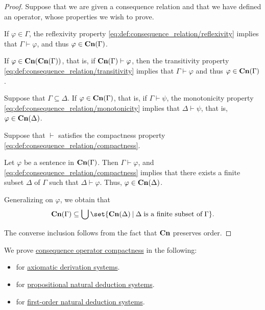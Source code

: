 \begin{proof}
   Suppose that we are given a consequence relation and that we have defined an operator, whose properties we wish to prove.

   If \( \varphi \in \Gamma \), the reflexivity property \eqref{eq:def:consequence_relation/reflexivity} implies that \( \Gamma \vdash \varphi \), and thus \( \varphi \in \op*{Cn}(\Gamma) \).

   If \( \varphi \in \op*{Cn}(\op*{Cn}(\Gamma)) \), that is, if \( \op*{Cn}(\Gamma) \vdash \varphi \), then the transitivity property \eqref{eq:def:consequence_relation/transitivity} implies that \( \Gamma \vdash \varphi \) and thus \( \varphi \in \op*{Cn}(\Gamma) \).

   Suppose that \( \Gamma \subseteq \Delta \). If \( \varphi \in \op*{Cn}(\Gamma) \), that is, if \( \Gamma \vdash \psi \), the monotonicity property \eqref{eq:def:consequence_relation/monotonicity} implies that \( \Delta \vdash \psi \), that is, \( \varphi \in \op*{Cn}(\Delta) \).

   Suppose that \( {\vdash} \) satisfies the compactness property \eqref{eq:def:consequence_relation/compactness}.

  Let \( \varphi \) be a sentence in \( \op*{Cn}(\Gamma) \). Then \( \Gamma \vdash \varphi \), and \eqref{eq:def:consequence_relation/compactness} implies that there exists a finite subset \( \Delta \) of \( \Gamma \) such that \( \Delta \vdash \varphi \). Thus, \( \varphi \in \op*{Cn}(\Delta) \).

  Generalizing on \( \varphi \), we obtain that
  \begin{equation*}
    \op*{Cn}(\Gamma) \subseteq \bigcup\set{ \op*{Cn}(\Delta) \given \Delta \T{is a finite subset of} \Gamma }.
  \end{equation*}

  The converse inclusion follows from the fact that \( \op*{Cn} \) preserves order.
\end{proof}

\begin{remark}\label{rem:logical_compactness_theorems}
  We prove \hyperref[def:consequence_operator/compactness]{consequence operator compactness} in the following:
  \begin{itemize}
    \item {} for \hyperref[def:axiomatic_derivation_system]{axiomatic derivation systems}.
    \item {} for \hyperref[def:propositional_natural_deduction_system]{propositional natural deduction systems}.
    \item {} for \hyperref[def:first_order_natural_deduction_system]{first-order natural deduction systems}.
  \end{itemize}
\end{remark}

